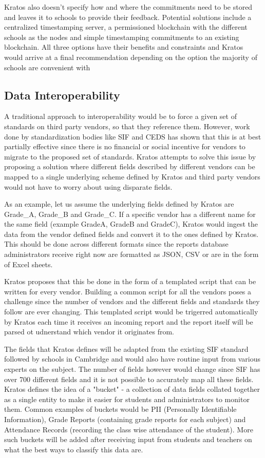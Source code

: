 \documentclass{article}
\begin{document}
\bigbreak
Kratos also doesn't specify how and where the commitments need to be stored and leaves it to schools to provide their feedback. Potential solutions include a centralized timestamping server, a permissioned blockchain with the different schools as the nodes and simple timestamping commitments to an existing blockchain. All three options have their benefits and constraints and Kratos would arrive at a final recommendation depending on the option the majority of schools are convenient with
\bigbreak

\subsection{Data Interoperability}
A traditional approach to interoperability would be to force a given set of standards on third party vendors, so that they reference them. However, work done by standardization bodies like SIF and CEDS has shown that this is at best partially effective since there is no financial or social incentive for vendors to migrate to the proposed set of standards. Kratos attempts to solve this issue by proposing a solution where different fields described by different vendors can be mapped to a single underlying scheme defined by Kratos and third party vendors would not have to worry about using disparate fields.

\bigbreak
As an example, let us assume the underlying fields defined by Kratos are Grade\_A, Grade\_B and Grade\_C. If a specific vendor has a different name for the same field (example GradeA, GradeB and GradeC), Kratos would ingest the data from the vendor defined fields and convert it to the ones defined by Kratos. This should be done across different formats since the reports database administrators receive right now are formatted as JSON, CSV or are in the form of Excel sheets.

\bigbreak
Kratos proposes that this be done in the form of a templated script that can be written for every vendor. Building a common script for all the vendors poses a challenge since the number of vendors and the different fields and standards they follow are ever changing. This templated script would be trigerred automatically by Kratos each time it receives an incoming report and the report itself will be parsed ot udnerstand which vendor it originates from.

\bigbreak
The fields that Kratos defines will be adapted from the existing SIF standard followed by schools in Cambridge and would also have routine input from various experts on the subject. The number of fields however would change since SIF has over 700 different fields and it is not possible to accurately map all these fields. Kratos defines the idea of a "bucket" - a collection of data fields collated together as a single entity to make it easier for students and administrators to monitor them. Common examples of buckets would be PII (Personally Identifiable Information), Grade Reports (containing grade reports for each subject) and Attendance Records (recording the class wise attendance of the student). More such buckets will be added after receiving input from students and teachers on what the best ways to classify this data are.
\end{document}

